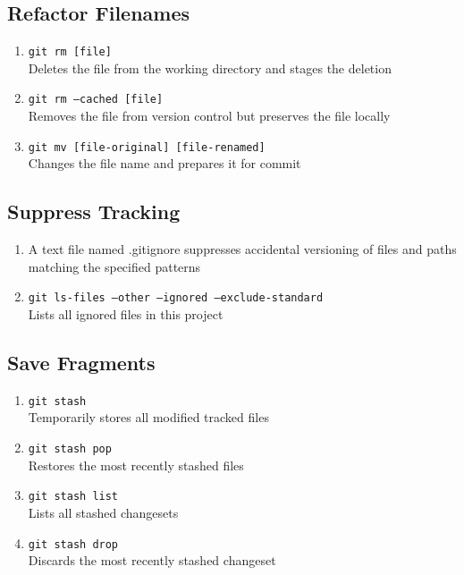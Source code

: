 \documentclass[a4paper, twoside, 8pt]{extarticle}
\newenvironment{enumx} {
	\begin{enumerate}[leftmargin=*]
	\setlength{\topsep}{0pt}
	\setlength{\itemsep}{0pt}
	\setlength{\parskip}{0pt}
	\setlength{\parsep}{0pt}
	}
{\end{enumerate}}
\begin{document}
\begin{multicols}{3}
\subsection{Refactor Filenames}
\begin{enumx}
    \item \texttt{git rm [file]}\\
    Deletes the file from the working directory and stages the deletion
    \item \texttt{git rm --cached [file]}\\
    Removes the file from version control but preserves the file locally
    \item \texttt{git mv [file-original] [file-renamed]}\\
    Changes the file name and prepares it for commit
\end{enumx}

\subsection{Suppress Tracking}
\begin{enumx}
    \item A text file named .gitignore suppresses accidental versioning of files and paths matching the specified patterns
    \item \texttt{git ls-files --other --ignored --exclude-standard}\\
    Lists all ignored files in this project
\end{enumx}

\subsection{Save Fragments}
\begin{enumx}
    \item \texttt{git stash}\\
    Temporarily stores all modified tracked files
    \item \texttt{git stash pop}\\
    Restores the most recently stashed files
    \item \texttt{git stash list}\\
    Lists all stashed changesets
    \item \texttt{git stash drop}\\
    Discards the most recently stashed changeset
\end{enumx}


\end{multicols}
\end{document}

